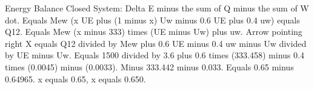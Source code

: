 Energy Balance  
Closed System: Delta E minus the sum of Q minus the sum of W dot.  
Equals Mew (x UE plus (1 minus x) Uw minus 0.6 UE plus 0.4 uw) equals Q12.  
Equals Mew (x minus 333) times (UE minus Uw) plus uw.  
Arrow pointing right X equals Q12 divided by Mew plus 0.6 UE minus 0.4 uw minus Uw divided by UE minus Uw.  
Equals 1500 divided by 3.6 plus 0.6 times (333.458) minus 0.4 times (0.0045) minus (0.0033).  
Minus 333.442 minus 0.033.  
Equals 0.65 minus 0.64965.  
x equals 0.65, x equals 0.650.